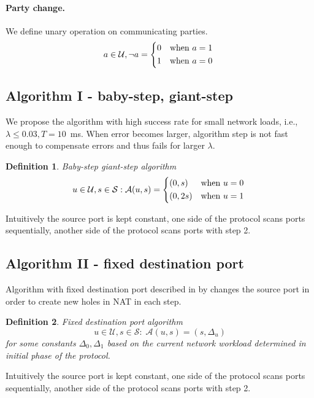 \documentclass[twoside]{article}
\newtheorem{mydef}{Definition}
\begin{document}
\begin{multicols}{2}
\paragraph{Party change.} 
We define unary operation on communicating parties. 
\[
a \in \mathcal{U},  \neg a = \begin{dcases*}
         0 & when $a=1$\\
         1 & when $a=0$
        \end{dcases*}
\]

\subsection{Algorithm I - baby-step, giant-step}
We propose the algorithm with high success rate for small network loads, i.e.,
$\lambda \leq 0.03, T=10$~ms. When error becomes larger,
algorithm step is not fast enough to compensate errors and thus fails for larger $\lambda$.

\begin{mydef}
Baby-step giant-step algorithm
\[
u \in \mathcal{U}, s \in \mathcal{S}: 
\mathcal{A}(u, s) = \begin{dcases*}
         (0, s)  & when $u=0$\\
         (0, 2s) & when $u=1$
        \end{dcases*}
\]
\end{mydef}

Intuitively the source port is kept constant, one side of the protocol scans ports sequentially, another
side of the protocol scans ports with step 2.

\subsection{Algorithm II - fixed destination port}
Algorithm with fixed destination port described in by \citep{Wang:2006:RSN:1156422.1156550}
changes the source port in order to create new holes in NAT in each step.

\begin{mydef}
Fixed destination port algorithm
\[
u \in \mathcal{U}, s \in \mathcal{S}: \;
\mathcal{A}(u, s) = (s, \Delta_u)
\] for some constants $\Delta_0, \Delta_1$ based on the current network workload determined in initial phase
of the protocol.
\end{mydef}

Intuitively the source port is kept constant, one side of the protocol scans ports sequentially, another
side of the protocol scans ports with step 2.


\end{multicols}
\end{document}
